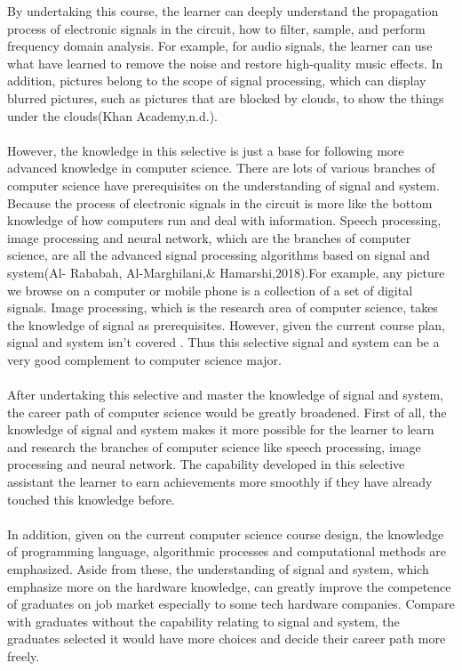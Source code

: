 \documentclass{article}
\begin{document}
	By undertaking this course, the learner can deeply understand the propagation process of electronic signals in the circuit, how to filter, sample, and perform frequency domain analysis. For example, for audio signals, the learner can use what have learned to remove the noise and restore high-quality music effects. In addition, pictures belong to the scope of signal processing, which can display blurred pictures, such as pictures that are blocked by clouds, to show the things under the clouds(Khan Academy,n.d.). \\
	\\
	However, the knowledge in this selective is just a base for following more advanced knowledge in computer science. There are lots of various branches of computer science have prerequisites on the understanding of signal and system. Because the process of electronic signals in the circuit is more like the bottom knowledge of how computers run and deal with information. Speech processing, image processing and neural network, which are the branches of computer science, are all the advanced signal processing algorithms based on signal and system(Al- Rababah, Al-Marghilani,& Hamarshi,2018).For example, any picture we browse on a computer or mobile phone is a collection of a set of digital signals. Image processing, which is the research area of computer science, takes the knowledge of signal as prerequisites. However, given the current course plan, signal and system isn't covered . Thus this selective signal and system can be a very good complement to computer science major. \\
	\\
	After undertaking this selective and master the knowledge of signal and system, the career path of computer science would be greatly broadened. First of all, the knowledge of signal and system makes it more possible for the learner to learn and research the branches of computer science like speech processing, image processing and neural network. The capability developed in this selective assistant the learner to earn achievements more smoothly if they have already touched this knowledge before.\\
	\\
	In addition, given on the current computer science course design, the knowledge of programming language, algorithmic processes and computational methods are emphasized. Aside from these, the understanding of signal and system, which emphasize more on the hardware knowledge, can greatly improve the competence of graduates on job market especially to some tech hardware companies. Compare with graduates without the capability relating to signal and system, the graduates selected it would have more choices and decide their career path more freely.
	
\end{document}
